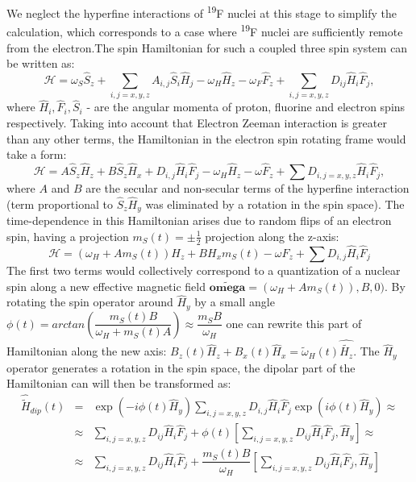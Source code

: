 \documentclass[a4paper, 12pt]{article}
\begin{document}
We neglect the hyperfine interactions of \textsuperscript{19}F nuclei at this stage to simplify the calculation, which corresponds to a case where \textsuperscript{19}F nuclei are sufficiently remote from the electron.The spin Hamiltonian for such a coupled three spin system can be written as: 
\begin{equation}
\mathcal{H} =  \omega_S \hat{S}_z + \sum_{i,j=x,y,z} A_{i,j} \hat{S}_i \hat{H}_j - \omega_H \hat{H}_z - \omega_F \hat{F}_z + \sum_{i,j=x,y,z} D_{ij} \hat{H}_i \hat{F}_j,
\end{equation}
where $\hat{H}_i, \hat{F}_i, \hat{S}_i$ - are the angular momenta of proton, fluorine and electron spins respectively. Taking into account that Electron Zeeman interaction is greater than any other terms, the Hamiltonian in the electron spin rotating frame would take a form:
\begin{equation}
\mathcal{H}  = A \hat{S}_z \hat{H}_z + B \hat{S}_z \hat{H}_x + D_{i,j} \hat{H}_i \hat{F}_j -  \omega_H \hat{H}_z - \omega \hat{F}_z + \sum D_{i,j=x,y,z} \hat{H}_i \hat{F}_j,
\end{equation}
where $A$ and $B$ are the secular and non-secular terms of the hyperfine interaction (term proportional to $\hat{S}_z \hat{H}_y$ was eliminated by a rotation in the spin space). The time-dependence in this Hamiltonian arises due to random flips of an electron spin, having a projection $m_S(t)=\pm \frac{1}{2}$ projection along the z-axis:
\begin{equation}
\mathcal{H} = (\omega_H + A m_S(t)) H_z + B H_x m_S(t) - \omega \hat{F}_z + \sum D_{i,j} \hat{H}_i \hat{F}_j
\end{equation}
The first two terms would collectively correspond to a quantization of a nuclear spin along a new effective magnetic field $\tilde{\mathbf{omega}}=(\omega_H + A m_S(t)),  B, 0)$. By rotating the spin operator around $\hat{H}_y$ by a small angle $\phi(t)= arctan(\dfrac{m_S(t)B}{\omega_H + m_S(t) A} )  \approx \dfrac{m_S B}{\omega_H}$ one can rewrite this part of Hamiltonian along the new axis: $B_z(t) \hat{H}_z + B_x(t) \hat{H}_x = \tilde{\omega}_H(t) \hat{\tilde{H_z}}$. The $\hat{H}_y$ operator generates a rotation in the spin space, the dipolar part of the Hamiltonian can will then be transformed as:
\begin{equation}
\begin{array}{lcl}
\hat{\tilde{H}}_{dip} (t) &=&  \exp(-i \phi(t) \hat{H}_y) \sum\limits_{i,j=x,y,z} D_{i,j} \hat{H}_i \hat{F}_j \exp(i \phi(t) \hat{H}_y)  \approx  \\
&\approx& \sum \limits_{i,j=x,y,z} D_{ij} \hat{H}_i \hat{F}_j+ \phi(t)[ \sum \limits_{i,j=x,y,z} D_{ij} \hat{H}_i \hat{F}_j, \hat{H}_y] \approx \\
&\approx& \sum \limits_{i,j=x,y,z} D_{ij} \hat{H}_i \hat{F}_j + \dfrac{m_S(t) B}{\omega_H} [ \sum \limits_{i,j=x,y,z} D_{ij} \hat{H}_i \hat{F}_j, \hat{H}_y]
\end{array}
\end{equation}
\end{document}
